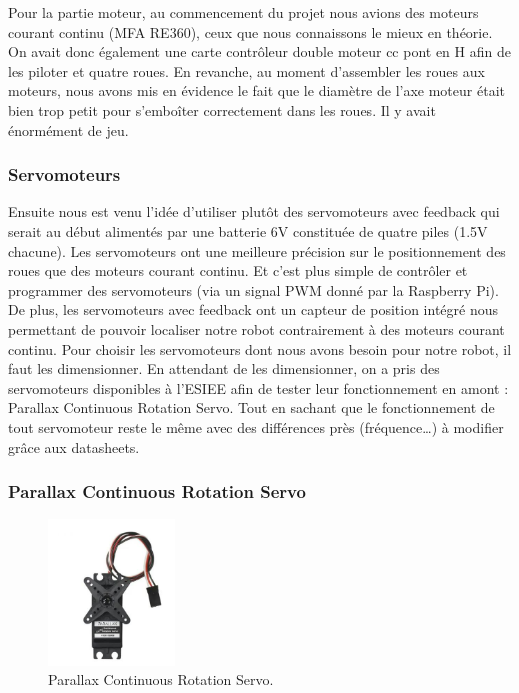 \documentclass[a4paper,12pt]{report}  %
\begin{document}
Pour la partie moteur, au commencement du projet nous avions des moteurs courant continu (MFA RE360), ceux que nous connaissons le mieux en théorie. On avait donc également une carte contrôleur double moteur cc pont en H afin de les piloter et quatre roues. En revanche, au moment d’assembler les roues aux moteurs, nous avons mis en évidence le fait que le diamètre de l’axe moteur était bien trop petit pour s’emboîter correctement dans les roues. Il y avait énormément de jeu. \\

\subsubsection{Servomoteurs}
Ensuite nous est venu l’idée d’utiliser plutôt des servomoteurs avec feedback qui serait au début alimentés par une batterie 6V constituée de quatre piles (1.5V chacune).
Les servomoteurs ont une meilleure précision sur le positionnement des roues que des moteurs courant continu. Et c’est plus simple de contrôler et programmer des servomoteurs (via un signal PWM donné par la Raspberry Pi). De plus, les servomoteurs avec feedback ont un capteur de position intégré nous permettant de pouvoir localiser notre robot contrairement à des moteurs courant continu. 
Pour choisir les servomoteurs dont nous avons besoin pour notre robot, il faut les dimensionner. En attendant de les dimensionner, on a pris des servomoteurs disponibles à l’ESIEE afin de tester leur fonctionnement en amont : Parallax Continuous Rotation Servo. Tout en sachant que le fonctionnement de tout servomoteur reste le même avec des différences près (fréquence…) à modifier grâce aux datasheets. \\

\subsubsection{Parallax Continuous Rotation Servo}

\begin{figure}[H]
	\centering
	\includegraphics[width=0.3\textwidth]{./attachments/moteur_rotation.jpg}
	\caption{Parallax Continuous Rotation Servo.}
	
\end{figure}
\end{document}
